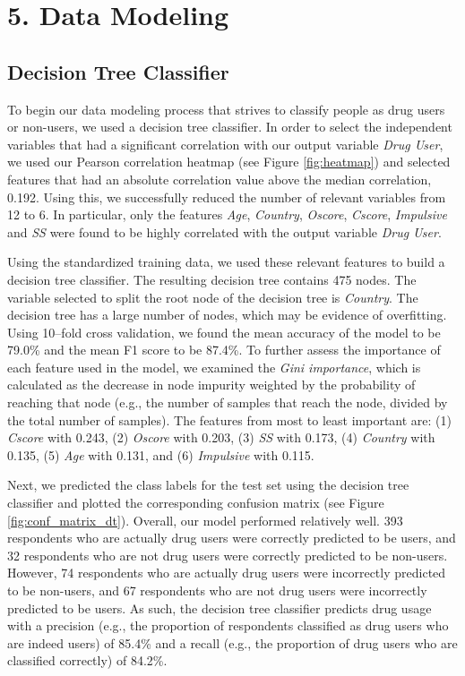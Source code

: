 \documentclass[10pt]{article}
\begin{document}
\section*{5. Data Modeling}

\subsection*{Decision Tree Classifier}

To begin our data modeling process that strives to classify people as drug users or non-users, we used a decision tree classifier. In order to select the independent variables that had a significant correlation with our output variable \textit{Drug User}, we used our Pearson correlation heatmap (see Figure \ref{fig:heatmap}) and selected features that had an absolute correlation value above the median correlation, 0.192. Using this, we successfully reduced the number of relevant variables from 12 to 6. In particular, only the features \textit{Age}, \textit{Country}, \textit{Oscore}, \textit{Cscore}, \textit{Impulsive} and \textit{SS} were found to be highly correlated with the output variable \textit{Drug User}.

Using the standardized training data, we used these relevant features to build a decision tree classifier. The resulting decision tree contains 475 nodes. The variable selected to split the root node of the decision tree is \textit{Country}. The decision tree has a large number of nodes, which may be evidence of overfitting. Using 10–fold cross validation, we found the mean accuracy of the model to be 79.0\% and the mean F1 score to be 87.4\%. To further assess the importance of each feature used in the model, we examined the \textit{Gini importance}, which is calculated as the decrease in node impurity weighted by the probability of reaching that node (e.g., the number of samples that reach the node, divided by the total number of samples). The features from most to least important are: (1) \textit{Cscore} with 0.243, (2) \textit{Oscore} with 0.203, (3) \textit{SS} with 0.173, (4) \textit{Country} with 0.135, (5) \textit{Age} with 0.131, and (6) \textit{Impulsive} with 0.115.

Next, we predicted the class labels for the test set using the decision tree classifier and plotted the corresponding confusion matrix (see Figure \ref{fig:conf_matrix_dt}). Overall, our model performed relatively well. 393 respondents who are actually drug users were correctly predicted to be users, and 32 respondents who are not drug users were correctly predicted to be non-users. However, 74 respondents who are actually drug users were incorrectly predicted to be non-users, and 67 respondents who are not drug users were incorrectly predicted to be users. As such, the decision tree classifier predicts drug usage with a precision (e.g., the proportion of respondents classified as drug users who are indeed users) of 85.4\% and a recall (e.g., the proportion of drug users who are classified correctly) of 84.2\%.
\end{document}

